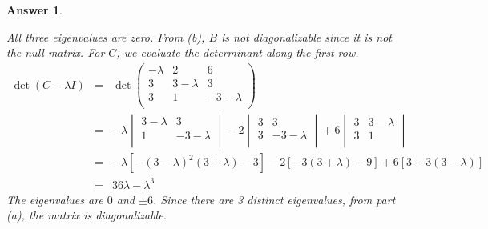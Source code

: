 \documentclass[a4paper]{article}
\newtheorem{ans}{Answer}[section]
\theoremstyle{new}
\begin{document}
\begin{ans}
\begin{enumerate}[label=(\alph*)]
All three eigenvalues are zero. From (b), $B$ is not diagonalizable since it is not the null matrix. For $C$, we evaluate the determinant along the first row.
\begin{eqnarray}
\det(C-\lambda I)&=&\det\begin{pmatrix}-\lambda&2&6\\3&3-\lambda&3\\3&1&-3-\lambda\\\end{pmatrix}\nonumber\\&=&-\lambda\begin{vmatrix}3-\lambda&3\\1&-3-\lambda\\\end{vmatrix}-2\begin{vmatrix}3&3\\3&-3-\lambda\\\end{vmatrix}+6\begin{vmatrix}3&3-\lambda\\3&1\\\end{vmatrix}\nonumber\\&=&-\lambda[-(3-\lambda)^2(3+\lambda)-3]-2[-3(3+\lambda)-9]+6[3-3(3-\lambda)]\nonumber\\&=&36\lambda-\lambda^3\nonumber
\end{eqnarray}
The eigenvalues are $0$ and $\pm 6$. Since there are 3 distinct eigenvalues, from part (a), the matrix is diagonalizable.
\end{enumerate}
\end{ans}
\newpage
\end{document}
